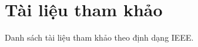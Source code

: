 \documentclass[../main.tex]{subfiles}
\begin{document}
\section{Tài liệu tham khảo}

Danh sách tài liệu tham khảo theo định dạng IEEE.
\end{document}
